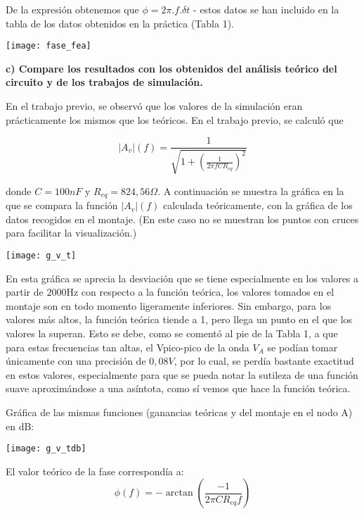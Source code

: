 \documentclass{article}
\begin{document}
\bigskip

De la expresión obtenemos que $\phi = 2\pi.f.\delta t $ - estos datos se han incluido en la tabla de los datos obtenidos en la práctica (Tabla 1).

\begin{center}
\texttt{[image: fase\_fea]}
\end{center}

\textbf{c) Compare los resultados con los obtenidos del análisis teórico del circuito y de los trabajos de simulación.}

En el trabajo previo, se observó que los valores de la simulación eran prácticamente los mismos que los teóricos. En el trabajo previo, se calculó que 

\[|A_v|(f)=\frac{1}{\sqrt{1+\left(\frac{1}{2\pi f C R_{eq}}\right)^2}}\]

donde $C=100nF$ y $R_{eq}=824,56\Omega.$%
\cleardoublepage
A continuación se muestra la gráfica en la que se compara la función $|A_v|(f)$ calculada teóricamente, con la gráfica de los datos recogidos en el montaje. (En este caso no se muestran los puntos con cruces para facilitar la visualización.)

\begin{center}
\texttt{[image: g\_v\_t]}
\end{center}

En esta gráfica se aprecia la desviación que se tiene especialmente en los valores a partir de $2000$Hz con respecto a la función teórica, los valores tomados en el montaje son en todo momento ligeramente inferiores. Sin embargo, para los valores más altos, la función teórica tiende a 1, pero llega un punto en el que los valores la superan. Esto se debe, como se comentó al pie de la Tabla 1, a que para estas frecuencias tan altas, el Vpico-pico de la onda $V_A$ se podían tomar únicamente con una precisión de $0,08V$, por lo cual, se perdía bastante exactitud en estos valores, especialmente para que se pueda notar la sutileza de una función suave aproximándose a una asíntota, como sí vemos que hace la función teórica.

Gráfica de las mismas funciones (ganancias teóricas y del montaje en el nodo A) en dB:
\begin{center}
\texttt{[image: g\_v\_tdb]}
\end{center}

El valor teórico de la fase correspondía a:
$$\phi (f)= - \arctan\left(\frac{-1}{2\pi C R_{eq} f}\right)$$
\end{document}
